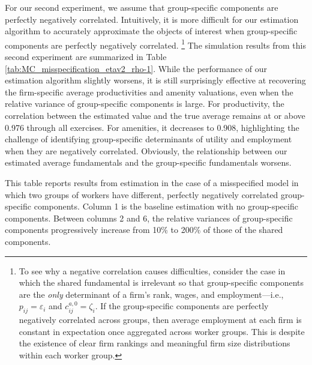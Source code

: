 For our second experiment, we assume that group-specific components are perfectly negatively correlated. Intuitively, it is more difficult for our estimation algorithm to accurately approximate the objects of interest when group-specific components are perfectly negatively correlated.%
%
\footnote{To see why a negative correlation causes difficulties, consider the case in which the shared fundamental is irrelevant so that group-specific components are the {\emph{only}} determinant of a firm's rank, wages, and employment---i.e., $p_{ij} = \varepsilon_{i}$ and $c_{ij}^{a, 0} = \zeta_{i}$. If the group-specific components are perfectly negatively correlated across groups, then average employment at each firm is constant in expectation once aggregated across worker groups. This is despite the existence of clear firm rankings and meaningful firm size distributions within each worker group.} %
%
The simulation results from this second experiment are summarized in Table \ref{tab:MC_misspecification_etav2_rho-1}. While the performance of our estimation algorithm slightly worsens, it is still surprisingly effective at recovering the firm-specific average productivities and amenity valuations, even when the relative variance of group-specific components is large. For productivity, the correlation between the estimated value and the true average remains at or above 0.976 through all exercises. For amenities, it decreases to 0.908, highlighting the challenge of identifying group-specific determinants of utility and employment when they are negatively correlated. Obviously, the relationship between our estimated average fundamentals and the group-specific fundamentals worsens.

%
\begin{table}[htbp!]
    \centering
    \caption{Estimation under perfectly negatively correlated group-specific components}
    \label{tab:MC_misspecification_etav2_rho-1}
    \resizebox{\textwidth}{!}{%
    
    }
    \begin{tablenotes}
        \footnotesize
        This table reports results from estimation in the case of a misspecified model in which two groups of workers have different, perfectly negatively correlated group-specific components. Column 1 is the baseline estimation with no group-specific components. Between columns 2 and 6, the relative variances of group-specific components progressively increase from 10\% to 200\% of those of the shared components. %
    \end{tablenotes}
\end{table}
%

